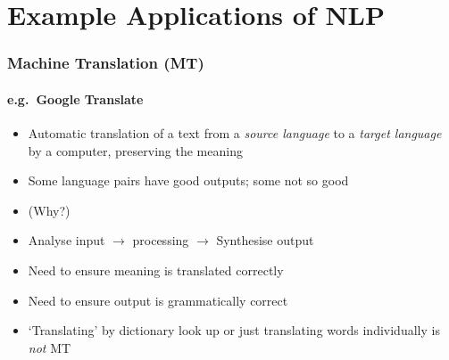 \section{Example Applications of NLP}

\begin{frame}
\frametitle{Machine Translation (MT)}
\framesubtitle{e.g.~Google Translate}
\begin{itemize}
\item Automatic translation of a text from a \emph{source language} to a \emph{target language} by a computer, preserving the meaning
\item Some language pairs have good outputs; some not so good
\item \alert{(Why?)}
\framebreak
\item Analyse input $\longrightarrow$ processing $\longrightarrow$ Synthesise output
\item Need to ensure meaning is translated correctly
\item Need to ensure output is grammatically correct
\item \alert{`Translating' by dictionary look up or just translating words individually is \emph{not} MT}
\end{itemize}
\end{frame}


